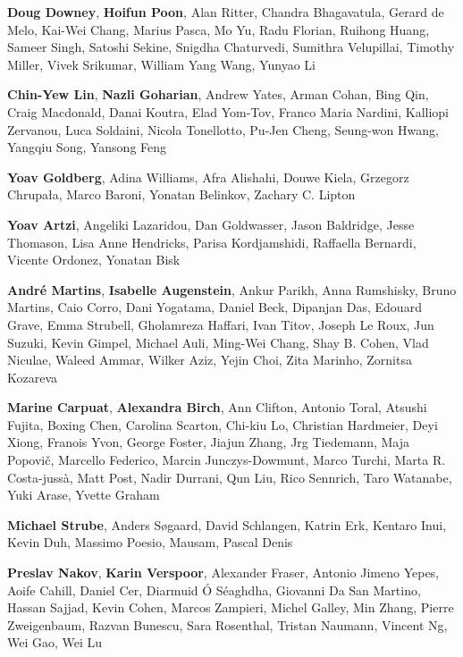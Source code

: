 \textbf{Doug Downey},
\textbf{Hoifun Poon},
Alan Ritter, Chandra Bhagavatula, Gerard de Melo, Kai-Wei Chang, Marius Pasca, Mo Yu, Radu Florian, Ruihong Huang, Sameer Singh, Satoshi Sekine, Snigdha Chaturvedi, Sumithra Velupillai, Timothy Miller, Vivek Srikumar, William Yang Wang, Yunyao Li

\textbf{Chin-Yew Lin},
\textbf{Nazli Goharian},
Andrew Yates, Arman Cohan, Bing Qin, Craig Macdonald, Danai Koutra, Elad Yom-Tov, Franco Maria Nardini, Kalliopi Zervanou, Luca Soldaini, Nicola Tonellotto, Pu-Jen Cheng, Seung-won Hwang, Yangqiu Song, Yansong Feng

\textbf{Yoav Goldberg},
Adina Williams, Afra Alishahi, Douwe Kiela, Grzegorz Chrupała, Marco Baroni, Yonatan Belinkov, Zachary C. Lipton

\textbf{Yoav Artzi},
Angeliki Lazaridou, Dan Goldwasser, Jason Baldridge, Jesse Thomason, Lisa Anne Hendricks, Parisa Kordjamshidi, Raffaella Bernardi, Vicente Ordonez, Yonatan Bisk

\textbf{Andr\'{e} Martins},
\textbf{Isabelle Augenstein},
Ankur Parikh, Anna Rumshisky, Bruno Martins, Caio Corro, Dani Yogatama, Daniel Beck, Dipanjan Das, Edouard Grave, Emma Strubell, Gholamreza Haffari, Ivan Titov, Joseph Le Roux, Jun Suzuki, Kevin Gimpel, Michael Auli, Ming-Wei Chang, Shay B. Cohen, Vlad Niculae, Waleed Ammar, Wilker Aziz, Yejin Choi, Zita Marinho, Zornitsa Kozareva

\textbf{Marine Carpuat},
\textbf{Alexandra Birch},
Ann Clifton, Antonio Toral, Atsushi Fujita, Boxing Chen, Carolina Scarton, Chi-kiu Lo, Christian Hardmeier, Deyi Xiong, Franois Yvon, George Foster, Jiajun Zhang, Jrg Tiedemann, Maja Popovi\v{c}, Marcello Federico, Marcin Junczys-Dowmunt, Marco Turchi, Marta R. Costa-juss\`{a}, Matt Post, Nadir Durrani, Qun Liu, Rico Sennrich, Taro Watanabe, Yuki Arase, Yvette Graham

\textbf{Michael Strube},
Anders S{\o}gaard, David Schlangen, Katrin Erk, Kentaro Inui, Kevin Duh, Massimo Poesio, Mausam, Pascal Denis

\textbf{Preslav Nakov},
\textbf{Karin Verspoor},
Alexander Fraser, Antonio Jimeno Yepes, Aoife Cahill, Daniel Cer, Diarmuid \'{O} S\'{e}aghdha, Giovanni Da San Martino, Hassan Sajjad, Kevin Cohen, Marcos Zampieri, Michel Galley, Min Zhang, Pierre Zweigenbaum, Razvan Bunescu, Sara Rosenthal, Tristan Naumann, Vincent Ng, Wei Gao, Wei Lu

